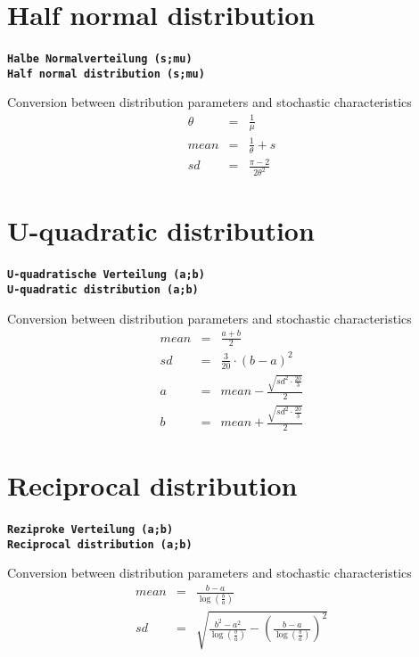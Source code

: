 \documentclass{svmono}
\def\cm#1{\textbf{\texttt{#1}}}
\begin{document}
\section*{Half normal distribution}
\cm{Halbe Normalverteilung (s;mu)}~\\
\cm{Half normal distribution (s;mu)}

Conversion between distribution parameters and stochastic characteristics
\begin{eqnarray*}
\theta&=&\frac{1}{\mu}\\
mean&=&\frac{1}{\theta}+s\\
sd&=&\frac{\pi-2}{2\theta^2}
\end{eqnarray*}





\section*{U-quadratic distribution}
\cm{U-quadratische Verteilung (a;b)}~\\
\cm{U-quadratic distribution (a;b)}

Conversion between distribution parameters and stochastic characteristics
\begin{eqnarray*}
mean&=&\frac{a+b}{2}\\
sd&=&\frac{3}{20}\cdot(b-a)^2\\
a&=&mean-\frac{\sqrt{sd^2\cdot\frac{20}{3}}}{2}\\
b&=&mean+\frac{\sqrt{sd^2\cdot\frac{20}{3}}}{2}
\end{eqnarray*}





\section*{Reciprocal distribution}
\cm{Reziproke Verteilung (a;b)}~\\
\cm{Reciprocal distribution (a;b)}

Conversion between distribution parameters and stochastic characteristics
\begin{eqnarray*}
mean&=&\frac{b-a}{\log\left(\frac{b}{a}\right)}\\
sd&=&\sqrt{\frac{b^2-a^2}{\log\left(\frac{b}{a}\right)}-\left(\frac{b-a}{\log\left(\frac{b}{a}\right)}\right)^2}
\end{eqnarray*}
\end{document}
